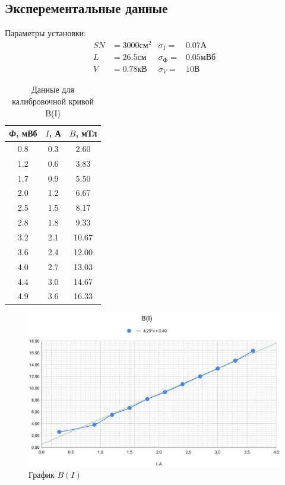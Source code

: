 \documentclass[a4paper]{article}
\begin{document}
\subsection*{Эксперементальные данные}

Параметры установки:
\begin{align*}
SN & = 3000 \text{см}^2 & \sigma_I = & 0.07\text{А}\\
L & = 26.5 \text{см} & \sigma_{\textit{Ф}} = &  0.05 \text{мВб}\\
V & = 0.78 \text{кВ} & \sigma_V = & 10 \text{В}
\end{align*}

\begin{table}[h]
\begin{center}
\caption{Данные для калибровочной кривой B(I)}
\begin{tabular}{|c|c|c|}
\hline 
\textit{Ф}, мВб & $I$, А & $B$, мТл \\ 
\hline 
0.8 & 0.3 & 2.60 \\ 
\hline 
1.2 & 0.6 & 3.83 \\ 
\hline 
1.7 & 0.9 & 5.50 \\ 
\hline 
2.0 & 1.2 & 6.67 \\ 
\hline 
2.5 & 1.5 & 8.17 \\ 
\hline 
2.8 & 1.8 & 9.33 \\ 
\hline 
3.2 & 2.1 & 10.67 \\ 
\hline 
3.6 & 2.4 & 12.00 \\ 
\hline 
4.0 & 2.7 & 13.03 \\ 
\hline 
4.4 & 3.0 & 14.67 \\ 
\hline 
4.9 & 3.6 & 16.33 \\ 
\hline 
\end{tabular} 
\end{center}
\end{table}

\begin{figure}[h]
\begin{center}
	\includegraphics[width = 1.1\textwidth]{B(I)}
	\caption{График $B(I)$}
\end{center}
\end{figure}
\end{document}
